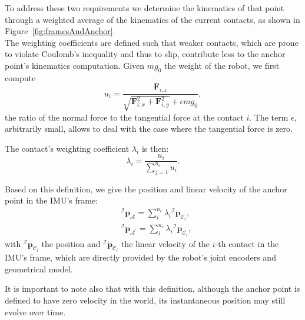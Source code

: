 \documentclass{IJCAS}
\begin{document}
To address these two requirements we determine the kinematics of that point through a weighted average of the kinematics of the current contacts, as shown in Figure~\ref{fig:framesAndAnchor}.  \\
The weighting coefficients are defined such that weaker contacts, which are prone to violate Coulomb's inequality and thus to slip, contribute less to the anchor point's kinematics computation. Given $mg_{0}$ the weight of the robot, we first compute 
\begin{equation}
    u_{i} = \frac{\boldsymbol{F}_{i,z}}{\sqrt{\boldsymbol{F}_{i,x}^2 + \boldsymbol{F}_{i,y}^2} + \epsilon mg_{0}}, \label{eq:ratio_ui}
\end{equation}
the ratio of the normal force to the tangential force at the contact $i$. The term $\epsilon$, arbitrarily small, allows to deal with the case where the tangential force is zero.

The contact's weighting coefficient $\lambda_{i}$ is then:
\begin{equation}
    \lambda_{i}=\frac{u_{i}}{\sum^{n_{c}}_{j=1}u_{i}}. \label{eq:lambda_i}
\end{equation}

Based on this definition, we give the position and linear velocity of the anchor point in the IMU's frame:
\begin{align} 
&{^{\mathcal{I}}}\boldsymbol{p}_{\mathcal{A}} = \sum^{n_{c}}_{i} \lambda_{i}  {^{\mathcal{I}}} \boldsymbol{p}_{{\mathcal{C}}_{i}}, \label{eq:imuAnchorPos} \\
&{^{\mathcal{I}}} \dot{\boldsymbol{p}}_{\mathcal{A}^{\prime}} = \sum^{n_{c}}_{i} \lambda_{i}  {^{\mathcal{I}}} \dot{\boldsymbol{p}}_{{\mathcal{C}}_{i}}, \label{eq:imuAnchorVel}
\end{align} 
with ${^{\mathcal{I}}} \boldsymbol{p}_{{\mathcal{C}}_{i}}$ the position and ${^{\mathcal{I}}} \dot{\boldsymbol{p}}_{{\mathcal{C}}_{i}}$ the linear velocity of the $i$-th contact in the IMU's frame, which are directly provided by the robot's joint encoders and geometrical model.

It is important to note also that with this definition, although the anchor point is defined to have zero velocity in the world, its instantaneous position may still evolve over time.
\end{document}
